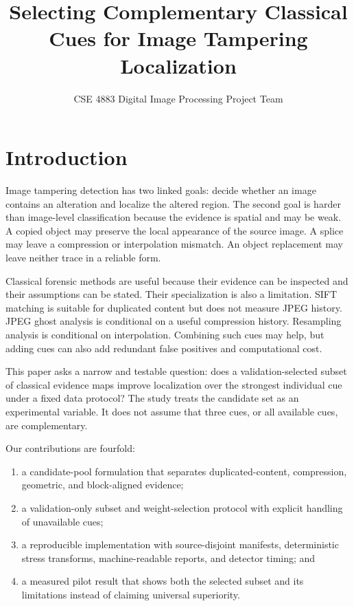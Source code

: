 \documentclass[sigconf,nonacm]{acmart}
\title[Complementary Cues for Tampering Localization]{Selecting Complementary Classical Cues for Image Tampering Localization}
\author{CSE 4883 Digital Image Processing Project Team}
\affiliation{\institution{Department of Computer Science and Engineering, United International University}\city{Dhaka}\country{Bangladesh}}
\begin{document}
\maketitle

\section{Introduction}
Image tampering detection has two linked goals: decide whether an image contains an alteration and localize the altered region. The second goal is harder than image-level classification because the evidence is spatial and may be weak. A copied object may preserve the local appearance of the source image. A splice may leave a compression or interpolation mismatch. An object replacement may leave neither trace in a reliable form.

Classical forensic methods are useful because their evidence can be inspected and their assumptions can be stated. Their specialization is also a limitation. SIFT matching is suitable for duplicated content but does not measure JPEG history. JPEG ghost analysis is conditional on a useful compression history. Resampling analysis is conditional on interpolation. Combining such cues may help, but adding cues can also add redundant false positives and computational cost.

This paper asks a narrow and testable question: does a validation-selected subset of classical evidence maps improve localization over the strongest individual cue under a fixed data protocol? The study treats the candidate set as an experimental variable. It does not assume that three cues, or all available cues, are complementary.

Our contributions are fourfold:
\begin{enumerate}[leftmargin=*]
  \item a candidate-pool formulation that separates duplicated-content, compression, geometric, and block-aligned evidence;
  \item a validation-only subset and weight-selection protocol with explicit handling of unavailable cues;
  \item a reproducible implementation with source-disjoint manifests, deterministic stress transforms, machine-readable reports, and detector timing; and
  \item a measured pilot result that shows both the selected subset and its limitations instead of claiming universal superiority.
\end{enumerate}
\end{document}
